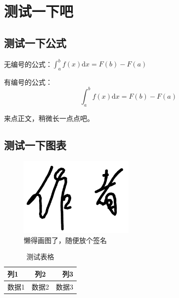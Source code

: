 
\section{测试一下吧}

\subsection{测试一下公式}

无编号的公式：\(\int_a^b f(x)\mathrm{d}x=F(b)-F(a)\)

有编号的公式：
\begin{equation}
    \int_a^b f(x)\mathrm{d}x=F(b)-F(a)
    \label{eq:example}
\end{equation}


来点正文，稍微长一点点吧。

\subsection{测试一下图表}

\begin{figure}[htbp]
    \centering
    \includegraphics[width=0.5\textwidth]{signatures/author.png}
    \caption{懒得画图了，随便放个签名}
    \label{fig:example}
\end{figure}

\begin{table}[htbp]
    \centering
    \caption{测试表格}
    \begin{tabularx}{0.8\linewidth}{|L|C|R|}
        \hline
        列1  & 列2  & 列3  \\
        \hline
        数据1 & 数据2 & 数据3 \\
        \hline
    \end{tabularx}
    \label{tab:example}
\end{table}

